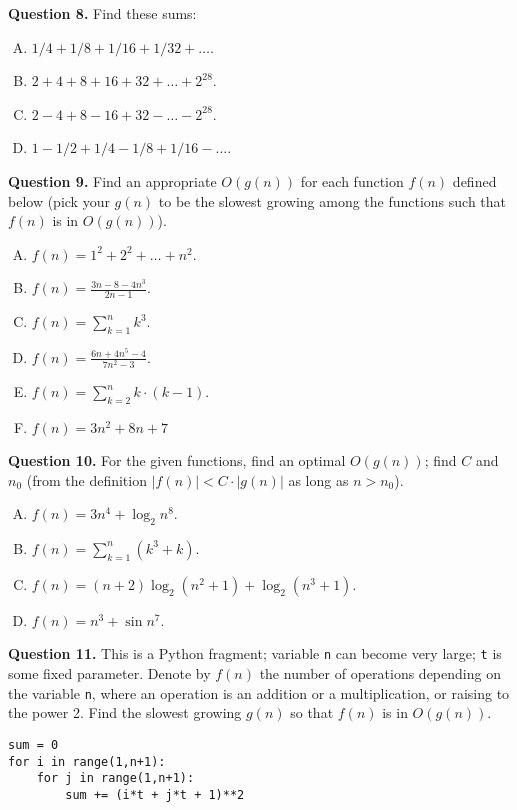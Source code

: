 \documentclass[jou]{apa6}
\begin{document}
\vspace{6pt}
{\bf Question 8.} Find these sums:
\begin{enumerate}[(A)]
\item $1/4 + 1/8 + 1/16 + 1/32 + \ldots$.
\item $2 + 4 + 8 + 16 + 32 + \ldots + 2^{28}$.
\item $2 - 4 + 8 - 16 + 32 - \ldots - 2^{28}$.
\item $1 - 1/2 + 1/4 - 1/8 + 1/16 - \ldots$.
\end{enumerate}

\vspace{6pt}
{\bf Question 9.} Find an appropriate $O(g(n))$ for each function $f(n)$ defined below 
(pick your $g(n)$ to be the slowest growing among the functions such that $f(n)$ is in $O(g(n))$). 
\begin{enumerate}[(A)]
\item $f(n) = 1^2 + 2^2 + \ldots + n^2$.
\item ${\displaystyle f(n) = \frac{3n - 8 - 4n^3}{2n - 1}}$. 
\item ${\displaystyle f(n) = \sum\limits_{k=1}^{n} k^3}$.
\item ${\displaystyle f(n) = \frac{6n + 4n^5 - 4}{7n^2 - 3}}$. 
\item ${\displaystyle f(n) = \sum\limits_{k=2}^{n} k\cdot(k-1)}$.
\item ${\displaystyle f(n) = 3n^2 + 8n + 7}$
\end{enumerate}

\vspace{6pt}
{\bf Question 10.}
For the given functions, find an optimal $O(g(n))$; find
$C$ and $n_0$ (from the definition $|f(n)| < C\cdot |g(n)|$ as long as $n > n_0$). 
\begin{enumerate}[(A)]
\item ${\displaystyle f(n) = 3n^4 + \log_2 n^8}$. 
\item ${\displaystyle f(n) = \sum\limits_{k=1}^{n} (k^3 + k)}$.
\item ${\displaystyle f(n) = (n + 2)\log_2 (n^2 + 1) + \log_2 (n^3 + 1)}$.
\item ${\displaystyle f(n) = n^3 + \sin n^7}$.
\end{enumerate}


\vspace{6pt}
{\bf Question 11.} This is a Python fragment; variable {\tt n} can become very large; {\tt t} is some
fixed parameter. Denote by $f(n)$ the number of operations depending on the variable {\tt n}, 
where an operation is an addition or a multiplication, or raising to the power 2.
Find the slowest growing $g(n)$ so that $f(n)$ is in $O(g(n))$. 
\begin{verbatim}
sum = 0
for i in range(1,n+1):
    for j in range(1,n+1):
        sum += (i*t + j*t + 1)**2
\end{verbatim}
\end{document}

